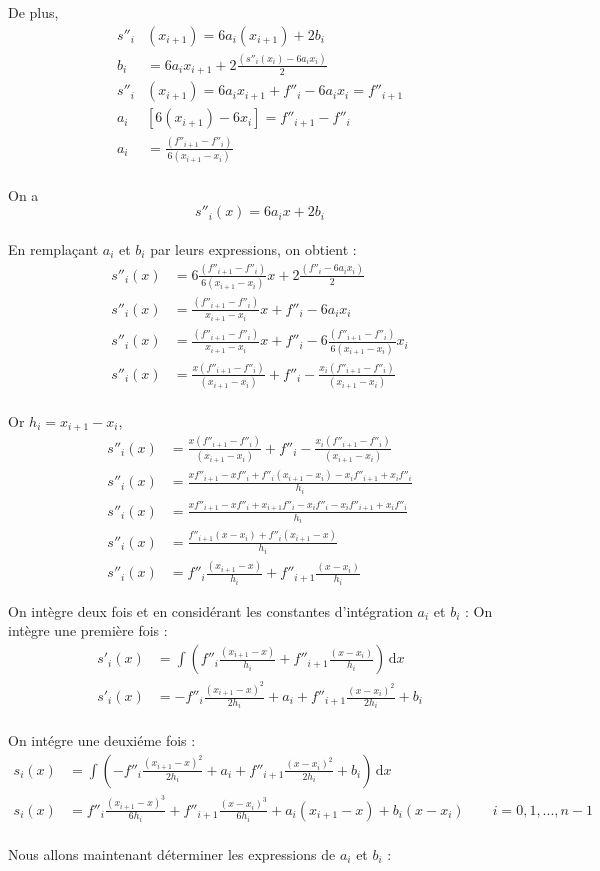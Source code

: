 \documentclass{article}
\begin{document}
\begingroup\raggedleft
De plus,
\endgroup  
\begin{align*} 
s''_i&(x_{i+1})= 6a_i(x_{i+1})+2b_i 
\\[5pt]
b_i&=6a_ix_{i+1}+2\frac{(s''_i(x_i)-6a_ix_i)}{2}
\\[15pt]
s''_i&(x_{i+1})= 6a_ix_{i+1}+f''_i-6a_ix_i= f''_{i+1}
\\[5pt]
a_i&[6(x_{i+1})-6x_i]=f''_{i+1}-f''_i
\\[5pt]
a_i & =\frac{(f''_{i+1}-f''_i)}{6(x_{i+1}-x_i)} 
\end{align*} 
\\
On a \[s''_i(x) = 6a_ix + 2b_i\]
\\
En rempla\c cant $a_i$ et $b_i$ par leurs expressions, on obtient : 
\begin{align*} 
s''_i(x)&=6\frac{(f''_{i+1}-f''_i)}{6(x_{i+1}-x_i)}x + 2\frac{(f''_i-6a_ix_i)}{2}
\\[5pt]
s''_i(x)&=\frac{(f''_{i+1}-f''_i)}{x_{i+1}-x_i}x + f''_i-6a_ix_i
\\[5pt]
s''_i(x)&=\frac{(f''_{i+1}-f''_i)}{x_{i+1}-x_i}x + f''_i-6\frac{(f''_{i+1}-f''_i)}{6(x_{i+1}-x_i)}x_i
\\[5pt]
s''_i(x)&= \frac{x(f''_{i+1}-f''_i)}{(x_{i+1}-x_i)} + f''_i-\frac{x_i(f''_{i+1}-f''_i)}{(x_{i+1}-x_i)}
\end{align*} 
\\
Or $h_i=x_{i+1}-x_i$,
\begin{align*} 
s''_i(x) & = \frac{x(f''_{i+1}-f''_i)}{(x_{i+1}-x_i)} + f''_i-\frac{x_i(f''_{i+1}-f''_i)}{(x_{i+1}-x_i)}
\\[5pt]
s''_i(x) & = \frac{xf''_{i+1}-xf''_i + f''_i(x_{i+1}-x_i)-x_if''_{i+1}+ x_if''_i}{h_i}
\\[5pt]
s''_i(x) & = \frac{xf''_{i+1}-xf''_i + x_{i+1}f''_i-x_if''_i-x_if''_{i+1}+ x_if''_i}{h_i}
\\[5pt]
s''_i(x) & = \frac{f''_{i+1}(x-x_i) + f''_i(x_{i+1}-x)}{h_i}
\\[5pt]
s''_i(x)&= f''_i\frac{(x_{i+1}-x)}{h_i} + f''_{i+1}\frac{(x-x_i)}{h_i}
\end{align*} 

\begingroup\raggedleft
On int\`{e}gre deux fois et en consid\'{e}rant les constantes d'int\'{e}gration $a_i$ et $b_i$ :
On int\`{e}gre une premi\`{e}re fois :
\endgroup
\begin{align*} 
s'_i(x)&=\int\! (f''_i\frac{(x_{i+1}-x)}{h_i} + f''_{i+1}\frac{(x-x_i)}{h_i}) \, \mathrm{d}x
\\[5pt]
s'_i(x)&= -f''_i\frac{(x_{i+1}-x)^2}{2h_i} + a_i +  f''_{i+1}\frac{(x-x_i)^2}{2h_i} + b_i
\end{align*} 
\\
On int\'{e}gre une deuxi\'{e}me fois :
\\
\begin{align*} 
s_i(x)&=\int\! (-f''_i\frac{(x_{i+1}-x)^2}{2h_i} + a_i +  f''_{i+1}\frac{(x-x_i)^2}{2h_i} + b_i) \, \mathrm{d}x
\\[5pt]
s_i(x)& = f''_i \frac{(x_{i+1}-x)^3}{6h_i}+ f''_{i+1} \frac{(x-x_i)^3}{6h_i}+a_i(x_{i+1}-x) + b_i (x-x_i) \qquad i= 0,1,...,n-1 
\end{align*} 
\\
Nous allons maintenant d\'{e}terminer les expressions de $a_i$ et $b_i$ :
\end{document}
